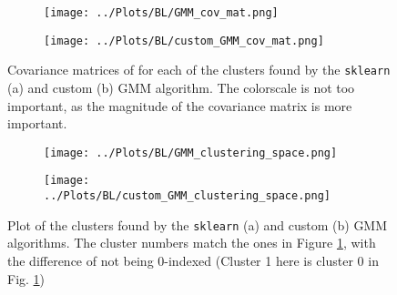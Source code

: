 \documentclass[12pt]{report} %
\begin{document}
\begin{figure}[htbp]
  \centering
  \begin{subfigure}[b]{0.7\textwidth}
      \texttt{[image: ../Plots/BL/GMM\_cov\_mat.png]}
      \caption{}
  \end{subfigure}
  \begin{subfigure}[b]{0.7\textwidth}
      \texttt{[image: ../Plots/BL/custom\_GMM\_cov\_mat.png]}
      \caption{}
  \end{subfigure}
  \caption{Covariance matrices of for each of the clusters found by the \texttt{sklearn} (a) and custom (b) GMM algorithm. The colorscale is not too important, as the magnitude of the covariance matrix is more important.}
  \label{fig:GMM_cov_mat}
\end{figure}


\begin{figure}[htbp]
  \centering
  \begin{subfigure}[b]{0.7\textwidth}
      \texttt{[image: ../Plots/BL/GMM\_clustering\_space.png]}
      \caption{}
  \end{subfigure}
  \begin{subfigure}[b]{0.7\textwidth}
      \texttt{[image: ../Plots/BL/custom\_GMM\_clustering\_space.png]}
      \caption{}
  \end{subfigure}
  \caption{Plot of the clusters found by the \texttt{sklearn} (a) and custom (b) GMM algorithms. The cluster numbers match the ones in Figure \ref{fig:GMM_cov_mat}, with the difference of not being 0-indexed (Cluster 1 here is cluster 0 in Fig. \ref{fig:GMM_cov_mat})}
  \label{fig:GMM_clusters}
\end{figure}

\newpage
\end{document}
